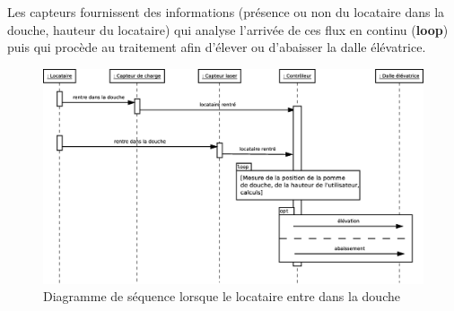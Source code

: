 Les capteurs fournissent des informations (présence ou non du locataire dans la douche, hauteur du locataire) qui analyse l'arrivée de ces flux en continu (\textbf{loop}) puis qui procède au traitement afin d'élever ou d'abaisser la dalle élévatrice. 
\begin{figure}[H]
	\centering
	\includegraphics[width=1\linewidth]{diagrams/bathroom/diagramme_sequence2.eps}
	\caption{Diagramme de séquence lorsque le locataire entre dans la douche}
	\label{fig:diagramme_seq2}
\end{figure}
